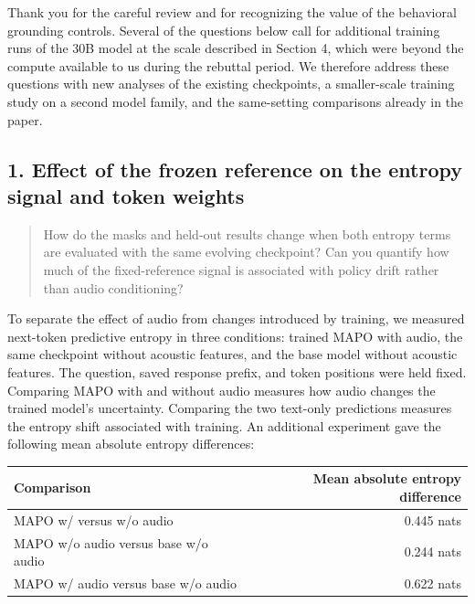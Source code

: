 Thank you for the careful review and for recognizing the value of the behavioral grounding controls. Several of the questions below call for additional training runs of the 30B model at the scale described in Section 4, which were beyond the compute available to us during the rebuttal period. We therefore address these questions with new analyses of the existing checkpoints, a smaller-scale training study on a second model family, and the same-setting comparisons already in the paper.

\subsection*{1. Effect of the frozen reference on the entropy signal and token weights}

\begin{quote}\small\color{ReviewQuote}
How do the masks and held-out results change when both entropy terms are evaluated with the same evolving checkpoint? Can you quantify how much of the fixed-reference signal is associated with policy drift rather than audio conditioning?

\end{quote}

To separate the effect of audio from changes introduced by training, we measured next-token predictive entropy in three conditions: trained MAPO with audio, the same checkpoint without acoustic features, and the base model without acoustic features. The question, saved response prefix, and token positions were held fixed. Comparing MAPO with and without audio measures how audio changes the trained model's uncertainty. Comparing the two text-only predictions measures the entropy shift associated with training. An additional experiment gave the following mean absolute entropy differences:

\par\medskip
\begingroup
\small
\setlength{\tabcolsep}{5pt}
\renewcommand{\arraystretch}{1.2}
\noindent\begin{tabularx}{\linewidth}{@{}LR@{}}
\toprule
\textbf{Comparison} & \textbf{Mean absolute entropy difference} \\
\midrule
MAPO w/ versus w/o audio & 0.445 nats \\
MAPO w/o audio versus base w/o audio & 0.244 nats \\
MAPO w/ audio versus base w/o audio & 0.622 nats \\
\bottomrule
\end{tabularx}
\par\endgroup\medskip

